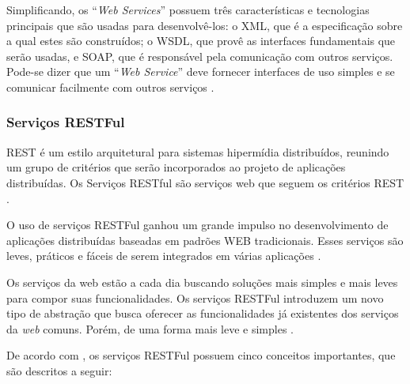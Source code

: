 Simplificando, os ``\textit{Web Services}'' possuem três características e tecnologias principais que são usadas para desenvolvê-los: o XML, que é a especificação sobre a qual estes são construídos; o WSDL, que provê as interfaces fundamentais que serão usadas, e SOAP, que é responsável pela comunicação com outros serviços. Pode-se dizer que um ``\textit{Web Service}'' deve fornecer interfaces de uso simples e se comunicar facilmente com outros serviços \cite{Newcomer:Lomow:2004}.

\subsubsection{Serviços RESTFul}

REST é um estilo arquitetural para sistemas hipermídia distribuídos, reunindo um grupo de critérios que serão incorporados ao projeto de aplicações distribuídas. Os Serviços RESTful são serviços web que seguem os critérios REST \cite{Filho:2009}.

O uso de serviços RESTFul ganhou um grande impulso no desenvolvimento de aplicações distribuídas baseadas em padrões WEB tradicionais. Esses serviços são leves, práticos e fáceis de serem integrados em várias aplicações \cite{Rosenberg:Curbera:Duftler:Khalaf:2008}.

Os serviços da web estão a cada dia buscando soluções mais simples e mais leves para compor suas funcionalidades. Os serviços RESTFul introduzem um novo tipo de abstração que busca oferecer as funcionalidades já existentes dos serviços da \textit{web} comuns. Porém, de uma forma mais leve e simples \cite{Pautasso:2009}.

De acordo com \cite{Filho:2009}, os serviços RESTFul possuem cinco conceitos importantes, que são descritos a seguir:

